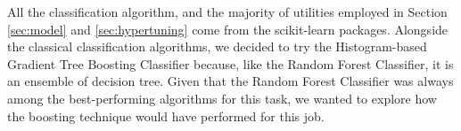 \documentclass[conference]{IEEEtran}
\begin{document}
All the classification algorithm, and the majority of utilities employed in Section \ref{sec:model} and \ref{sec:hypertuning} come from the scikit-learn packages\cite{scikit-learn}. Alongside the classical classification algorithms, we decided to try the Histogram-based Gradient Tree Boosting Classifier because, like the Random Forest Classifier, it is an ensemble of decision tree. Given that the Random Forest Classifier was always among the best-performing algorithms for this task, we wanted to explore how the boosting technique would have performed for this job.


\end{document}
